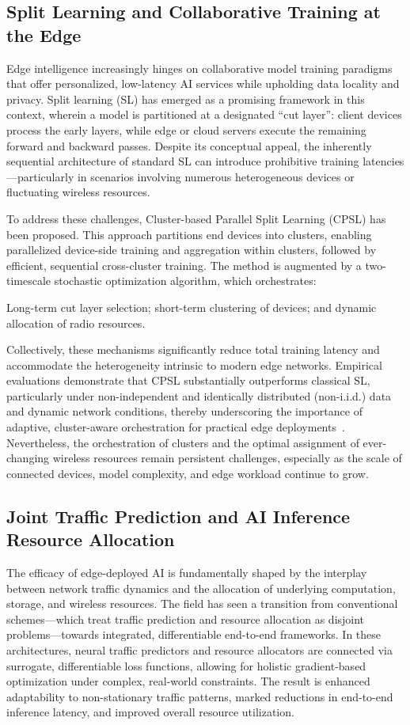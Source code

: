 \documentclass[sigconf]{acmart}
\begin{document}
\subsection{Split Learning and Collaborative Training at the Edge}

Edge intelligence increasingly hinges on collaborative model training paradigms that offer personalized, low-latency AI services while upholding data locality and privacy. Split learning (SL) has emerged as a promising framework in this context, wherein a model is partitioned at a designated ``cut layer'': client devices process the early layers, while edge or cloud servers execute the remaining forward and backward passes. Despite its conceptual appeal, the inherently sequential architecture of standard SL can introduce prohibitive training latencies—particularly in scenarios involving numerous heterogeneous devices or fluctuating wireless resources.

To address these challenges, Cluster-based Parallel Split Learning (CPSL) has been proposed. This approach partitions end devices into clusters, enabling parallelized device-side training and aggregation within clusters, followed by efficient, sequential cross-cluster training. The method is augmented by a two-timescale stochastic optimization algorithm, which orchestrates:

Long-term cut layer selection; short-term clustering of devices; and dynamic allocation of radio resources.

Collectively, these mechanisms significantly reduce total training latency and accommodate the heterogeneity intrinsic to modern edge networks. Empirical evaluations demonstrate that CPSL substantially outperforms classical SL, particularly under non-independent and identically distributed (non-i.i.d.) data and dynamic network conditions, thereby underscoring the importance of adaptive, cluster-aware orchestration for practical edge deployments~\cite{ref47}. Nevertheless, the orchestration of clusters and the optimal assignment of ever-changing wireless resources remain persistent challenges, especially as the scale of connected devices, model complexity, and edge workload continue to grow.

\subsection{Joint Traffic Prediction and AI Inference Resource Allocation}

The efficacy of edge-deployed AI is fundamentally shaped by the interplay between network traffic dynamics and the allocation of underlying computation, storage, and wireless resources. The field has seen a transition from conventional schemes—which treat traffic prediction and resource allocation as disjoint problems—towards integrated, differentiable end-to-end frameworks. In these architectures, neural traffic predictors and resource allocators are connected via surrogate, differentiable loss functions, allowing for holistic gradient-based optimization under complex, real-world constraints. The result is enhanced adaptability to non-stationary traffic patterns, marked reductions in end-to-end inference latency, and improved overall resource utilization.
\end{document}
